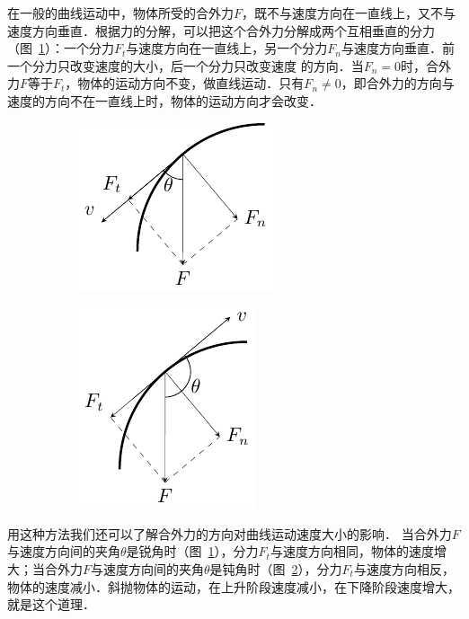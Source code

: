 在一般的曲线运动中，物体所受的合外力$F$，既不与速度方向在一直线上，又不与速度方向垂直．根据力的分解，可以把这个合外力分解成两个互相垂直的分力（图~\ref{fig_A_4-23a}）：一个分力$F_t$与速度方向在一直线上，另一个分力$F_n$与速度方向垂直．前一个分力只改变速度的大小，后一个分力只改变速度
的方向．当$F_n=0$时，合外力$F$等于$F_t$，物体的运动方向不变，做直线运动．只有$F_n\ne 0$，即合外力的方向与速度的方向不在一直线上时，物体的运动方向才会改变．
\begin{figure}[htbp]
	\centering
	\begin{subfigure} {0.4\linewidth} 
		\centering
		\includegraphics{fig/A/4-23a.pdf} 
		\caption{}\label{fig_A_4-23a} 
	\end{subfigure}
	\hfil
	\begin{subfigure} {0.4\linewidth} 
		\centering
		\includegraphics{fig/A/4-23b.pdf} 
		\caption{}\label{fig_A_4-23b} 
	\end{subfigure}
	\caption{}\label{fig_A_4-23}
\end{figure}

用这种方法我们还可以了解合外力的方向对曲线运动速度大小的影响．
当合外力$F$与速度方向间的夹角$\theta$是锐角时（图~\ref{fig_A_4-23a}），分力$F_t$与速度方向相同，物体的速度增大；当合外力$F$与速度方向间的夹角$\theta$是钝角时（图~\ref{fig_A_4-23b}），分力$F_t$与速度方向相反，物体的速度减小．斜抛物体的运动，在上升阶段速度减小，在下降阶段速度增大，就是这个道理．




